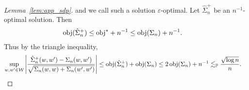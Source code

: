 \begin{proof}[Lemma~\ref{lem:app_sdp}]
  and we call such a solution $\varepsilon$-optimal.
  Let $\hat \Sigma_n^+$ be an $n^{-1}$-optimal solution.
  Then
  \begin{align*}
    \mathrm{obj}(\hat \Sigma_n^+)
    &\leq \mathrm{obj}^* + n^{-1}
    \leq \mathrm{obj}(\Sigma_n) + n^{-1}.
  \end{align*}
  Thus by the triangle inequality,
  \begin{align*}
    \sup_{w,w' \in \mathcal{W}}
    \left|
    \frac{\hat \Sigma_n^+(w,w') - \Sigma_n(w,w')}
    {\sqrt{\Sigma_n(w,w) + \Sigma_n(w',w')}}
    \right|
    &\leq
    \mathrm{obj}(\hat \Sigma_n^+)
    + \mathrm{obj}(\Sigma_n)
    \leq 2 \, \mathrm{obj}(\Sigma_n) + n^{-1}
    \lesssim_{\mathbb{P}}
    \frac{\sqrt{\log n}}{n}.
  \end{align*}
\end{proof}

